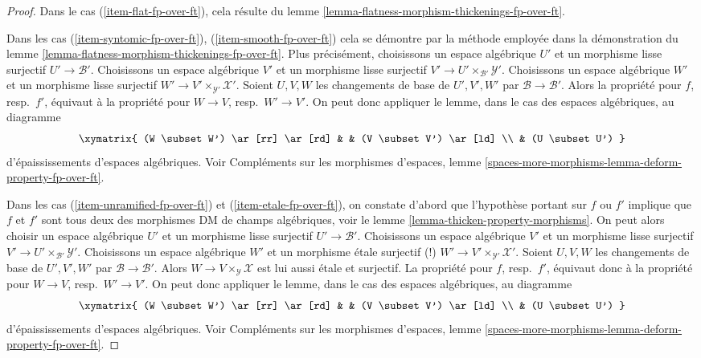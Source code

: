 \begin{proof}
Dans le cas (\ref{item-flat-fp-over-ft}), cela résulte du
lemme \ref{lemma-flatness-morphism-thickenings-fp-over-ft}.

\medskip\noindent
Dans les cas
(\ref{item-syntomic-fp-over-ft}), (\ref{item-smooth-fp-over-ft})
cela se démontre par la méthode employée dans la démonstration du
lemme \ref{lemma-flatness-morphism-thickenings-fp-over-ft}.
Plus précisément, choisissons un espace algébrique $U'$ et un morphisme lisse surjectif
$U' \to \mathcal{B}'$.
Choisissons un espace algébrique $V'$ et un morphisme lisse surjectif
$V' \to U' \times_{\mathcal{B}'} \mathcal{Y}'$.
Choisissons un espace algébrique $W'$ et un morphisme lisse surjectif
$W' \to V' \times_{\mathcal{Y}'} \mathcal{X}'$. Soient $U, V, W$
les changements de base de $U', V', W'$ par $\mathcal{B} \to \mathcal{B}'$.
Alors la propriété pour $f$, resp.\ $f'$,
équivaut à la propriété pour $W \to V$, resp.\ $W' \to V'$.
On peut donc appliquer le lemme, dans le cas des espaces algébriques, au
diagramme
$$
\xymatrix{
(W \subset W') \ar[rr] \ar[rd] & & (V \subset V') \ar[ld] \\
& (U \subset U')
}
$$
d'épaississements d'espaces algébriques. Voir
Compléments sur les morphismes d'espaces, lemme
\ref{spaces-more-morphisms-lemma-deform-property-fp-over-ft}.

\medskip\noindent
Dans les cas (\ref{item-unramified-fp-over-ft}) et (\ref{item-etale-fp-over-ft}),
on constate d'abord que l'hypothèse portant sur $f$ ou $f'$ implique que
$f$ et $f'$ sont tous deux des morphismes DM de champs algébriques, voir
le lemme \ref{lemma-thicken-property-morphisms}. On peut alors choisir
un espace algébrique $U'$ et un morphisme lisse surjectif
$U' \to \mathcal{B}'$.
Choisissons un espace algébrique $V'$ et un morphisme lisse surjectif
$V' \to U' \times_{\mathcal{B}'} \mathcal{Y}'$.
Choisissons un espace algébrique $W'$ et un morphisme \'etale surjectif (!)
$W' \to V' \times_{\mathcal{Y}'} \mathcal{X}'$. Soient $U, V, W$
les changements de base de $U', V', W'$ par $\mathcal{B} \to \mathcal{B}'$.
Alors $W \to V \times_\mathcal{Y} \mathcal{X}$ est lui aussi
\'etale et surjectif. La propriété pour $f$, resp.\ $f'$,
équivaut donc à la propriété pour $W \to V$, resp.\ $W' \to V'$.
On peut donc appliquer le lemme, dans le cas des espaces algébriques, au
diagramme
$$
\xymatrix{
(W \subset W') \ar[rr] \ar[rd] & & (V \subset V') \ar[ld] \\
& (U \subset U')
}
$$
d'épaississements d'espaces algébriques. Voir
Compléments sur les morphismes d'espaces, lemme
\ref{spaces-more-morphisms-lemma-deform-property-fp-over-ft}.


\end{proof}
